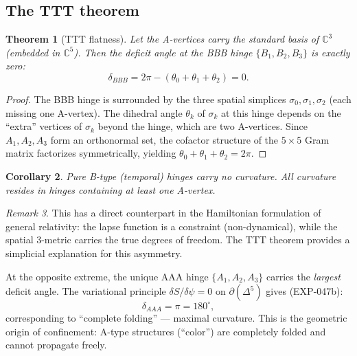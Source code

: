 \documentclass[12pt]{article}
\newtheorem{theorem}{Theorem}[section]
\newtheorem{corollary}[theorem]{Corollary}
\theoremstyle{remark}
\newtheorem{remark}[theorem]{Remark}
\theoremstyle{definition}
\newcommand{\CC}{\mathbb{C}}
\begin{document}
\subsection{The TTT theorem}
\label{sec:ttt}

\begin{theorem}[TTT flatness]
\label{thm:ttt}
Let the A-vertices carry the standard basis of $\CC^3$ (embedded in $\CC^5$).  Then the deficit angle at the BBB hinge $\{B_1, B_2, B_3\}$ is exactly zero:
\begin{equation}
\delta_{BBB} = 2\pi - (\theta_0 + \theta_1 + \theta_2) = 0.
\end{equation}
\end{theorem}

\begin{proof}
The BBB hinge is surrounded by the three spatial simplices $\sigma_0, \sigma_1, \sigma_2$ (each missing one A-vertex).  The dihedral angle $\theta_k$ of $\sigma_k$ at this hinge depends on the ``extra'' vertices of $\sigma_k$ beyond the hinge, which are two A-vertices.  Since $A_1, A_2, A_3$ form an orthonormal set, the cofactor structure of the $5 \times 5$ Gram matrix factorizes symmetrically, yielding $\theta_0 + \theta_1 + \theta_2 = 2\pi$.
\end{proof}

\begin{corollary}
Pure B-type (temporal) hinges carry no curvature.  All curvature resides in hinges containing at least one A-vertex.
\end{corollary}

\begin{remark}
This has a direct counterpart in the Hamiltonian formulation of general relativity: the lapse function is a constraint (non-dynamical), while the spatial 3-metric carries the true degrees of freedom.  The TTT theorem provides a simplicial explanation for this asymmetry.
\end{remark}

At the opposite extreme, the unique AAA hinge $\{A_1, A_2, A_3\}$ carries the \emph{largest} deficit angle.  The variational principle $\delta S/\delta\psi = 0$ on $\partial(\Delta^5)$ gives (EXP-047b):
\begin{equation}
\delta_{AAA} = \pi = 180^\circ,
\end{equation}
corresponding to ``complete folding'' --- maximal curvature.  This is the geometric origin of confinement: A-type structures (``color'') are completely folded and cannot propagate freely.
\end{document}

